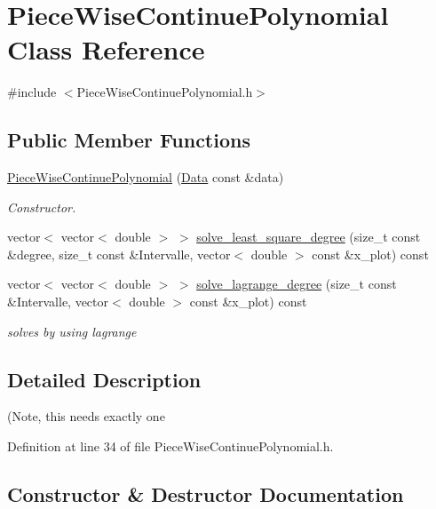 \hypertarget{class_piece_wise_continue_polynomial}{}\section{Piece\+Wise\+Continue\+Polynomial Class Reference}
\label{class_piece_wise_continue_polynomial}


{\ttfamily \#include $<$Piece\+Wise\+Continue\+Polynomial.\+h$>$}

\subsection*{Public Member Functions}
\begin{DoxyCompactItemize}
\item 
\mbox{\hyperlink{class_piece_wise_continue_polynomial_a1f3e40054d55cacc9079084683e259e7}{Piece\+Wise\+Continue\+Polynomial}} (\mbox{\hyperlink{struct_data}{Data}} const \&data)
\begin{DoxyCompactList}\small\item\em Constructor. \end{DoxyCompactList}\item 
vector$<$ vector$<$ double $>$ $>$ \mbox{\hyperlink{class_piece_wise_continue_polynomial_ac0f2d2cb02806e8866ea6b8c36434200}{solve\+\_\+least\+\_\+square\+\_\+degree}} (size\+\_\+t const \&degree, size\+\_\+t const \&Intervalle, vector$<$ double $>$ const \&x\+\_\+plot) const
\item 
vector$<$ vector$<$ double $>$ $>$ \mbox{\hyperlink{class_piece_wise_continue_polynomial_a8d69630f929742ccc6f1a411cf5d9c15}{solve\+\_\+lagrange\+\_\+degree}} (size\+\_\+t const \&Intervalle, vector$<$ double $>$ const \&x\+\_\+plot) const
\begin{DoxyCompactList}\small\item\em solves by using lagrange \end{DoxyCompactList}\end{DoxyCompactItemize}


\subsection{Detailed Description}
(Note, this needs exactly one 

Definition at line 34 of file Piece\+Wise\+Continue\+Polynomial.\+h.



\subsection{Constructor \& Destructor Documentation}
\mbox{\label{class_piece_wise_continue_polynomial_a1f3e40054d55cacc9079084683e259e7}} 
